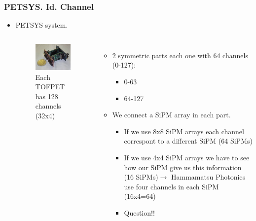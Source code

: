 \documentclass{beamer}
\begin{document}
\begin{frame}
\frametitle{PETSYS. Id. Channel}
\begin{itemize}
\item{} PETSYS system.

\begin{columns}

\begin{figure}[hbtp]
\centering
\includegraphics[scale=0.5]{PETSYS/Id_channel/TOFPET.jpeg}
\caption{Each TOFPET has 128 channels (32x4)}
\end{figure}


\begin{itemize}
\item{} 2 symmetric parts each one with 64 channels (0-127):
\begin{itemize}
\item{} 0-63
\item{} 64-127
\end{itemize}
\item{} We connect a SiPM array in each part.
\begin{itemize}
\item{} If we use 8x8 SiPM arrays each channel correspont to a different SiPM (64 SiPMs)
\item{} If we use 4x4 SiPM arrays we have to see how our SiPM give us this information (16 SiPMs)$\longrightarrow$ Hammamatsu Photonics use four channels in each SiPM (16x4=64)
\item{} Question!!
\end{itemize}

\end{itemize}

\end{columns}

\end{itemize}

\end{frame}
\end{document}
